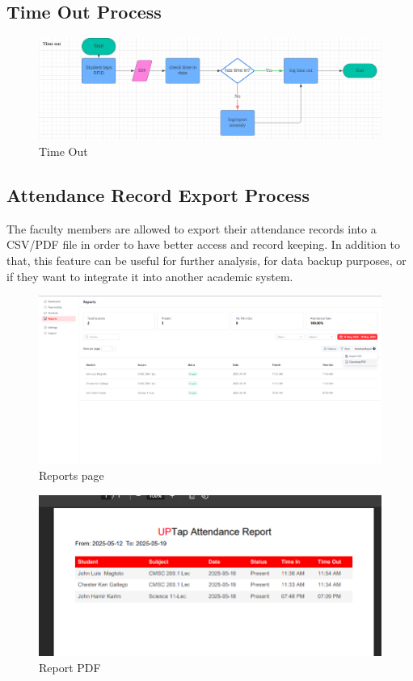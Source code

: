 \clearpage
\subsection{Time Out Process}
\begin{figure}[h] %
	\centering
	\includegraphics[width=1.0\textwidth]{figures/chapter4/timeout.png} %
	\caption{Time Out}
	\label{fig:timeout}
\end{figure}

\subsection{Attendance Record Export Process}
The faculty members are allowed to export their attendance records into a CSV/PDF file in order to have better access and record keeping. In addition to that, this feature can be useful for further analysis, for data backup purposes, or if they want to integrate it into another academic system. 
\begin{figure}[h] %
	\centering
	\includegraphics[width=1.0\textwidth]{figures/chapter4/att_ui.png} %
	\caption{Reports page}
	\label{fig:att_ui}
\end{figure}
\begin{figure}[h] %
	\centering
	\includegraphics[width=1.0\textwidth]{figures/chapter4/att_report.png} %
	\caption{Report PDF}
	\label{fig:att_report}
\end{figure}
\clearpage
